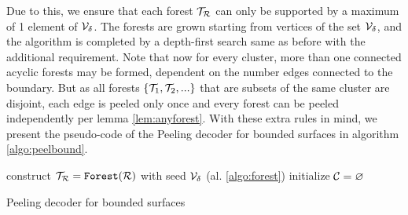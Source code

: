 Due to this, we ensure that each forest $\mathcal{T}_{\mathcal{R}}$ can only be supported by a maximum of 1 element of $\mathcal{V}_\delta$. The forests are grown starting from vertices of the set $\mathcal{V}_\delta$, and the algorithm is completed by a depth-first search same as before with the additional requirement. Note that now for every cluster, more than one connected acyclic forests may be formed, dependent on the number edges connected to the boundary. But as all forests $\{\mathcal{T}_1, \mathcal{T}_2,...\}$ that are subsets of the same cluster are disjoint, each edge is peeled only once and every forest can be peeled independently per lemma \ref{lem:anyforest}. With these extra rules in mind, we present the pseudo-code of the Peeling decoder for bounded surfaces in algorithm \ref{algo:peelbound}.

\begin{algorithm}[htb]
  \BlankLine
  \BlankLine
  construct $\mathcal{T}_{\mathcal{R}} = \texttt{Forest}(\mathcal{R})$ with seed $\mathcal{V}_\delta$ (al. \ref{algo:forest})\;
  initialize $\mathcal{C} = {\varnothing}$\;
  \BlankLine
  \caption{Peeling decoder for bounded surfaces \cite{delfosse2017linear}}\label{algo:peelbound}
\end{algorithm}






